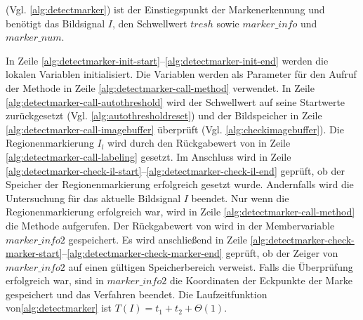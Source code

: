  (Vgl. \autoref{alg:detectmarker}) ist der Einstiegspunkt der Markenerkennung und benötigt das
 Bildsignal $I$, den Schwellwert $\mathit{tresh}$ sowie $\mathit{marker\_info}$ und $\mathit{marker\_num}$.

In Zeile \ref{alg:detectmarker-init-start}--\ref{alg:detectmarker-init-end} werden die lokalen Variablen initialisiert.
 Die Variablen werden als Parameter für den Aufruf der Methode  in Zeile
 \ref{alg:detectmarker-call-method} verwendet. In Zeile \ref{alg:detectmarker-call-autothreshold} wird der Schwellwert
 auf seine Startwerte zurückgesetzt (Vgl. \autoref{alg:autothresholdreset}) und der Bildspeicher in Zeile
 \ref{alg:detectmarker-call-imagebuffer} überprüft (Vgl. \autoref{alg:checkimagebuffer}). Die Regionenmarkierung $I_l$
 wird durch den Rückgabewert von  in Zeile \ref{alg:detectmarker-call-labeling} gesetzt. Im
 Anschluss wird in Zeile \ref{alg:detectmarker-check-il-start}--\ref{alg:detectmarker-check-il-end} geprüft, ob der
 Speicher der Regionenmarkierung erfolgreich gesetzt wurde. Andernfalls wird die Untersuchung für das aktuelle
 Bildsignal $I$ beendet. Nur wenn die Regionenmarkierung erfolgreich war, wird in Zeile
 \ref{alg:detectmarker-call-method} die Methode  aufgerufen. Der Rückgabewert von
  wird in der Membervariable $\mathit{marker\_info2}$ gespeichert. Es wird anschließend in
 Zeile \ref{alg:detectmarker-check-marker-start}--\ref{alg:detectmarker-check-marker-end} geprüft, ob der Zeiger von
 $\mathit{marker\_info2}$ auf einen gültigen Speicherbereich verweist. Falls die Überprüfung erfolgreich war, sind in
 $\mathit{marker\_info2}$ die Koordinaten der Eckpunkte der Marke gespeichert und das Verfahren beendet.
 Die Laufzeitfunktion von\autoref{alg:detectmarker} ist $T(I) = t_{1} + t_{2} + \Theta(1)$.



\clearpage



\clearpage
